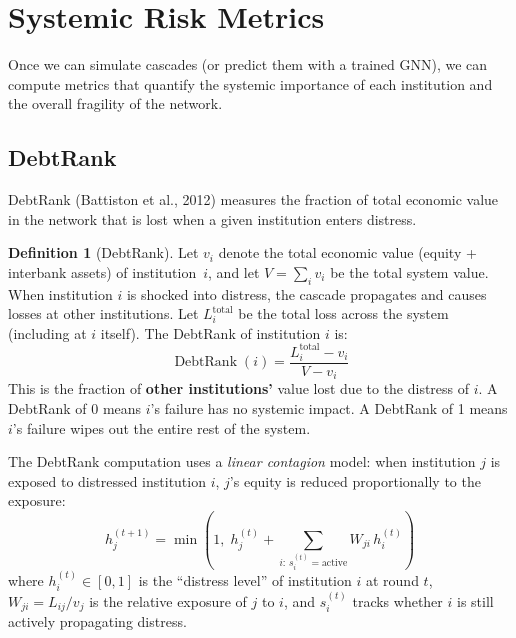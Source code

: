 \documentclass[11pt, a4paper]{article}
\theoremstyle{definition}
\newtheorem{definition}{Definition}[section]
\theoremstyle{plain}
\theoremstyle{remark}
\newcommand{\DebtRank}{\operatorname{DebtRank}}
\begin{document}
\section{Systemic Risk Metrics}
\label{sec:systemic-metrics}

Once we can simulate cascades (or predict them with a trained GNN), we can compute
metrics that quantify the systemic importance of each institution and the overall
fragility of the network.

\subsection{DebtRank}

DebtRank (Battiston et al., 2012) measures the fraction of total economic value
in the network that is lost when a given institution enters distress.

\begin{definition}[DebtRank]\label{def:debtrank}
Let $v_i$ denote the total economic value (equity + interbank assets) of institution~$i$,
and let $V = \sum_i v_i$ be the total system value.
When institution $i$ is shocked into distress, the cascade propagates and
causes losses at other institutions.
Let $L_i^{\text{total}}$ be the total loss across the system (including at $i$
itself).
The DebtRank of institution $i$ is:
\begin{equation}\label{eq:debtrank}
    \DebtRank(i) = \frac{L_i^{\text{total}} - v_i}{V - v_i}
\end{equation}
This is the fraction of \textbf{other institutions'} value lost due to the distress
of $i$.
A DebtRank of 0 means $i$'s failure has no systemic impact.
A DebtRank of 1 means $i$'s failure wipes out the entire rest of the system.
\end{definition}

The DebtRank computation uses a \emph{linear contagion} model: when institution $j$
is exposed to distressed institution $i$, $j$'s equity is reduced proportionally
to the exposure:
\begin{equation}\label{eq:debtrank-prop}
    h_j^{(t+1)} = \min\!\left(1,\; h_j^{(t)} + \sum_{i:\, s_i^{(t)} = \text{active}} W_{ji}\, h_i^{(t)}\right)
\end{equation}
where $h_i^{(t)} \in [0, 1]$ is the ``distress level'' of institution $i$ at
round $t$, $W_{ji} = L_{ij} / v_j$ is the relative exposure of $j$ to $i$,
and $s_i^{(t)}$ tracks whether $i$ is still actively propagating distress.
\end{document}
